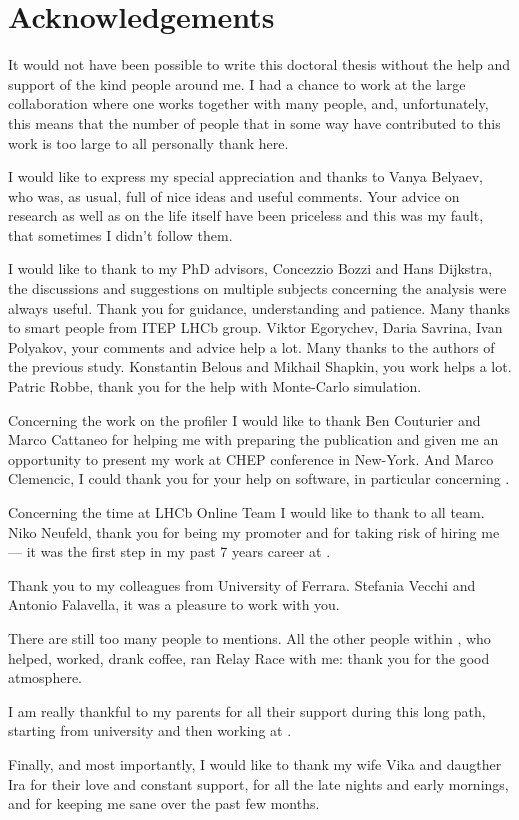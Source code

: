 \chapter*{Acknowledgements}
It would not have been possible to write this doctoral thesis without the help
and support of the kind people around me. I had a chance to work at the large
\lhcb collaboration where one works together with many people, and, unfortunately,
this means that the number of people that in some way have contributed to this
work is too large to all personally thank here.

I would like to express my special appreciation and thanks to Vanya Belyaev,
who was, as usual, full of nice ideas and useful comments. Your advice on
research as well as on the life itself have been priceless and this was my
fault, that sometimes I didn't follow them.

I would like to thank to my PhD advisors, Concezzio Bozzi and Hans Dijkstra,
the discussions and suggestions on multiple subjects concerning the analysis
were always useful. Thank you for guidance, understanding and patience.
Many thanks to smart people from ITEP LHCb group. Viktor Egorychev, Daria Savrina,
Ivan Polyakov, your comments and advice help a lot. Many thanks to the authors
of the previous \chib study. Konstantin Belous and Mikhail Shapkin, you work
helps a lot. Patric Robbe, thank  you for the help with Monte-Carlo simulation.


Concerning the work on the profiler I would like to thank Ben Couturier and
Marco Cattaneo for helping me with preparing the publication and given me an
opportunity to present my work at CHEP conference in New-York. And Marco
Clemencic, I could thank you for your help on software, in particular
concerning \gaudi.

Concerning the time at LHCb Online Team I would like to thank to all
team. Niko Neufeld, thank you for being my promoter and for taking risk of 
hiring me --- it was the first step in my past 7 years career at \cern.

Thank you to my colleagues from University of Ferrara. Stefania Vecchi and
Antonio Falavella, it was a pleasure to work with you.

There are still too many people to mentions. All the other people within \lhcb,
who helped, worked, drank coffee, ran Relay Race with me: thank you for the
good atmosphere.

I am really thankful to my parents for all their support during this long path,
starting from university and then working at \cern.

Finally, and most importantly, I would like to thank my wife Vika and daugther
Ira for their love and constant support, for all the late nights and early
mornings, and for keeping me sane over the past few months.

